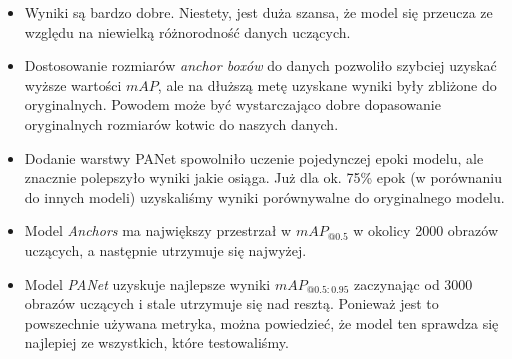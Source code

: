 \documentclass{article}
\begin{document}
\begin{itemize}
    \item Wyniki są bardzo dobre. Niestety, jest duża szansa, że model się przeucza ze względu na niewielką różnorodność danych uczących.
    \item Dostosowanie rozmiarów \textit{anchor boxów} do danych pozwoliło szybciej uzyskać wyższe wartości \(mAP\), ale na dłuższą metę uzyskane wyniki były zbliżone do oryginalnych. Powodem może być wystarczająco dobre dopasowanie oryginalnych rozmiarów kotwic do naszych danych.
    \item Dodanie warstwy PANet spowolniło uczenie pojedynczej epoki modelu, ale znacznie polepszyło wyniki jakie osiąga. Już dla ok. 75\% epok (w porównaniu do innych modeli) uzyskaliśmy wyniki porównywalne do oryginalnego modelu.
    \item Model \textit{Anchors} ma największy przestrzał w $mAP_{@0.5}$ w okolicy 2000 obrazów uczących, a następnie utrzymuje się najwyżej.
    \item Model \textit{PANet} uzyskuje najlepsze wyniki $mAP_{@0.5:0.95}$ zaczynając od 3000 obrazów uczących i stale utrzymuje się nad resztą. Ponieważ jest to powszechnie używana metryka, można powiedzieć, że model ten sprawdza się najlepiej ze wszystkich, które testowaliśmy.
\end{itemize}



\end{document}
